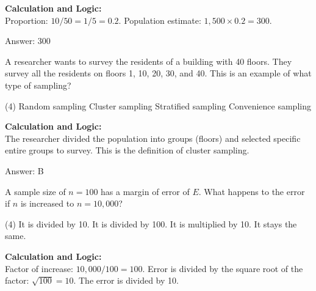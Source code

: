 \documentclass[11pt,paper=a4,answers]{exam}
\begin{document}
\begin{questions}
\begin{solution}
\textbf{Calculation and Logic:} \\
Proportion: $10 / 50 = 1 / 5 = 0.2$. Population estimate: $1,500 \times 0.2 = 300$.

\vspace{30pt}

Answer: \colorbox{yellow!100}{300}
\end{solution}

\vspace{60pt}

\question
A researcher wants to survey the residents of a building with 40 floors. They survey all the residents on floors 1, 10, 20, 30, and 40. This is an example of what type of sampling?
\begin{tasks}(4)
    \task Random sampling
    \task Cluster sampling
    \task Stratified sampling
    \task Convenience sampling
\end{tasks}

\begin{solution}
\textbf{Calculation and Logic:} \\
The researcher divided the population into groups (floors) and selected specific entire groups to survey. This is the definition of cluster sampling.

\vspace{30pt}

Answer: \colorbox{yellow!100}{B}
\end{solution}

\vspace{60pt}

\question
A sample size of $n=100$ has a margin of error of $E$. What happens to the error if $n$ is increased to $n=10,000$?
\begin{tasks}(4)
    \task It is divided by 10.
    \task It is divided by 100.
    \task It is multiplied by 10.
    \task It stays the same.
\end{tasks}

\begin{solution}
\textbf{Calculation and Logic:} \\
Factor of increase: $10,000 / 100 = 100$. Error is divided by the square root of the factor: $\sqrt{100} = 10$. The error is divided by 10.

\vspace{30pt}


\end{solution}
\end{questions}
\end{document}
